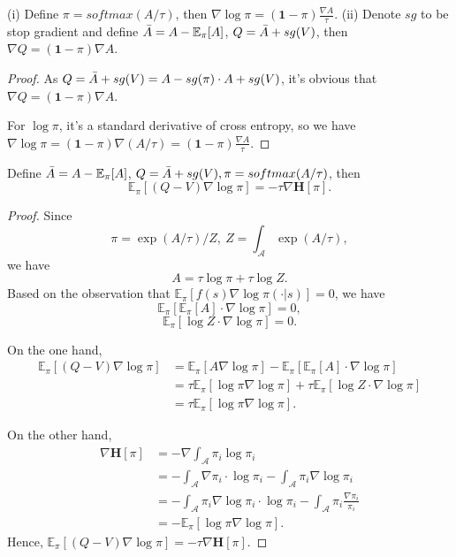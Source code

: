 \begin{Lemma_app}
(i) Define $\pi = softmax(A / \tau)$, then $\nabla \log \pi = (\textbf{1} - \pi) \frac{\nabla A}{\tau}$. 
(ii) Denote $sg$ to be stop gradient and define $\Bar{A} = A - \mathbb{E}_\pi [A]$, $Q = \Bar{A} + sg(V)$, then $\nabla Q = (\textbf{1} - \pi) \nabla A$.
\label{lemma_app:vannila_grad}
\end{Lemma_app}
\begin{proof}

As $Q = \Bar{A} + sg(V) = A - sg(\pi)\cdot A + sg(V)$, it's obvious that $\nabla Q = (\textbf{1} - \pi) \nabla A$.

For $\log \pi$, it's a standard derivative of cross entropy, so we have $\nabla \log \pi = (\textbf{1} - \pi) \nabla (A / \tau) = (\textbf{1} - \pi) \frac{\nabla A}{\tau}$.
\end{proof}

\begin{Lemma_app}
Define $\Bar{A}= A - \mathbb{E}_\pi[A]$, $Q = \Bar{A} + sg(V), \pi = softmax(A / \tau)$, then 
$$
\mathbb{E}_\pi \left[ (Q - V) \nabla \log \pi \right]
= - \tau \nabla \textbf{H}[\pi].
$$
\label{lemma_app:eqiv_pg_ent}
\end{Lemma_app}
\begin{proof}
Since 
$$
\pi = \exp(A / \tau) / Z,\ Z = \int_\mathcal{A} \exp(A / \tau),
$$
we have 
$$
A = \tau \log \pi + \tau \log Z.
$$
Based on the observation that $\mathbb{E}_\pi \left[ f(s) \nabla \log \pi (\cdot | s) \right] = 0$, 
we have 
$$\mathbb{E}_\pi \left[ \mathbb{E}_\pi[A] \cdot \nabla \log \pi \right] = 0,$$ 
$$\mathbb{E}_\pi \left[ \log Z \cdot \nabla \log \pi \right] = 0.$$

On the one hand,
$$
\begin{aligned}
    \mathbb{E}_\pi \left[ (Q - V) \nabla \log \pi \right]
    &= \mathbb{E}_\pi \left[ A \nabla \log \pi \right] 
    - \mathbb{E}_\pi \left[ \mathbb{E}_\pi[A] \cdot \nabla \log \pi \right] \\
    &= \tau \mathbb{E}_\pi \left[ \log \pi \nabla \log \pi \right]
    + \tau \mathbb{E}_\pi \left[ \log Z \cdot \nabla \log \pi \right] \\
    &= \tau \mathbb{E}_\pi \left[ \log \pi \nabla \log \pi \right].
\end{aligned}
$$

On the other hand, 
$$
\begin{aligned}
    \nabla \textbf{H} [\pi] 
    &= - \nabla \int_\mathcal{A} \pi_i \log \pi_i \\
    &= - \int_\mathcal{A}  \nabla \pi_i \cdot \log \pi_i - \int_\mathcal{A} \pi_i \nabla \log \pi_i  \\
    &= - \int_\mathcal{A}  \pi_i \nabla \log \pi_i \cdot \log \pi_i - \int_\mathcal{A}  \pi_i \frac{\nabla \pi_i}{\pi_i} \\
    &= - \mathbb{E}_\pi \left[ \log \pi \nabla \log \pi \right].
\end{aligned}
$$
Hence, $
\mathbb{E}_\pi \left[ (Q - V) \nabla \log \pi \right]
= - \tau \nabla \textbf{H}[\pi]
$.
\end{proof}

